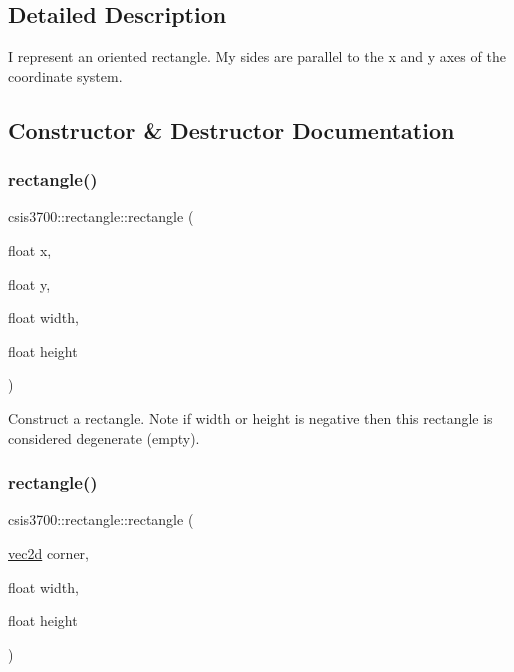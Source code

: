 \subsection{Detailed Description}
I represent an oriented rectangle. My sides are parallel to the x and y axes of the coordinate system. 

\subsection{Constructor \& Destructor Documentation}
\mbox{\label{classcsis3700_1_1rectangle_a12769987479c35eb82d4c327c5af31fb}} 
\subsubsection{\texorpdfstring{rectangle()}{rectangle()}\hspace{0.1cm}{\footnotesize\ttfamily [1/3]}}
{\footnotesize\ttfamily csis3700\+::rectangle\+::rectangle (\begin{DoxyParamCaption}\item[{float}]{x,  }\item[{float}]{y,  }\item[{float}]{width,  }\item[{float}]{height }\end{DoxyParamCaption})}

Construct a rectangle. Note if width or height is negative then this rectangle is considered degenerate (empty). \mbox{\label{classcsis3700_1_1rectangle_a343355b4f013ac440b155d634ebc1c5c}} 
\subsubsection{\texorpdfstring{rectangle()}{rectangle()}\hspace{0.1cm}{\footnotesize\ttfamily [2/3]}}
{\footnotesize\ttfamily csis3700\+::rectangle\+::rectangle (\begin{DoxyParamCaption}\item[{\hyperlink{classcsis3700_1_1vec2d}{vec2d}}]{corner,  }\item[{float}]{width,  }\item[{float}]{height }\end{DoxyParamCaption})}

